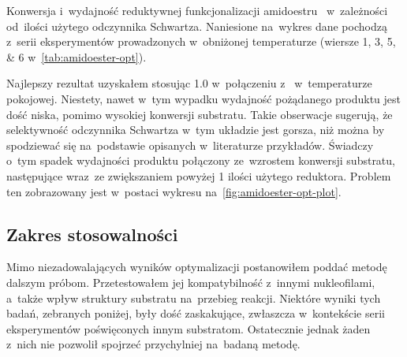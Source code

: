 \begin{marginfigure}
  \caption{
    Konwersja i~wydajność reduktywnej funkcjonalizacji amidoestru~
      w~zależności od~ilości użytego odczynnika Schwartza.
    Naniesione na~wykres dane pochodzą z~serii eksperymentów prowadzonych w~obniżonej temperaturze
      (wiersze \numlist{1; 3; 5; 6} w~\cref{tab:amidoester-opt}).
  }
  \label{fig:amidoester-opt-plot}
\end{marginfigure}
Najlepszy rezultat uzyskałem stosując \SI{1.0}{\equiv} \schwartz{} w~połączeniu
  z~ w~temperaturze pokojowej.
Niestety, nawet w~tym wypadku wydajność pożądanego produktu jest dość niska,
  pomimo wysokiej konwersji substratu.
Takie obserwacje sugerują, że selektywność odczynnika Schwartza w~tym układzie
  jest gorsza, niż można by spodziewać się na~podstawie opisanych w~literaturze przykładów.
Świadczy o~tym spadek wydajności produktu połączony ze~wzrostem konwersji substratu,
  następujące wraz~ze zwiększaniem powyżej \SI{1}{\equiv} ilości użytego reduktora.
Problem ten zobrazowany jest w~postaci wykresu na~\cref{fig:amidoester-opt-plot}.

\subsection{Zakres stosowalności}
Mimo niezadowalających wyników optymalizacji postanowiłem poddać metodę dalszym próbom.
Przetestowałem jej kompatybilność z~innymi nukleofilami, a~także wpływ struktury substratu
  na~przebieg reakcji.
Niektóre wyniki tych badań, zebranych poniżej, były dość zaskakujące, zwłaszcza w~kontekście
  serii eksperymentów poświęconych innym substratom.
Ostatecznie jednak żaden z~nich nie pozwolił spojrzeć przychylniej na~badaną metodę.

